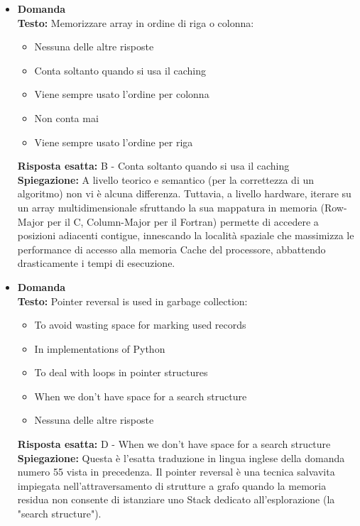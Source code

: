 \documentclass[12pt, a4paper]{article}
\newcounter{domandateoria}
\begin{document}
\begin{itemize}
    \item {}\textbf{Domanda \thedomandateoria} \\
    \textbf{Testo:} Memorizzare array in ordine di riga o colonna:
    \begin{itemize}
        \item[A)] Nessuna delle altre risposte
        \item[B)] Conta soltanto quando si usa il caching
        \item[C)] Viene sempre usato l'ordine per colonna
        \item[D)] Non conta mai
        \item[E)] Viene sempre usato l'ordine per riga
    \end{itemize}
    \textbf{Risposta esatta:} B - Conta soltanto quando si usa il caching \\
    \textbf{Spiegazione:} A livello teorico e semantico (per la correttezza di un algoritmo) non vi è alcuna differenza. Tuttavia, a livello hardware, iterare su un array multidimensionale sfruttando la sua mappatura in memoria (Row-Major per il C, Column-Major per il Fortran) permette di accedere a posizioni adiacenti contigue, innescando la località spaziale che massimizza le performance di accesso alla memoria Cache del processore, abbattendo drasticamente i tempi di esecuzione.
    \vspace{0.3cm}

    \item {}\textbf{Domanda \thedomandateoria} \\
    \textbf{Testo:} Pointer reversal is used in garbage collection:
    \begin{itemize}
        \item[A)] To avoid wasting space for marking used records
        \item[B)] In implementations of Python
        \item[C)] To deal with loops in pointer structures
        \item[D)] When we don't have space for a search structure
        \item[E)] Nessuna delle altre risposte
    \end{itemize}
    \textbf{Risposta esatta:} D - When we don't have space for a search structure \\
    \textbf{Spiegazione:} Questa è l'esatta traduzione in lingua inglese della domanda numero 55 vista in precedenza. Il pointer reversal è una tecnica salvavita impiegata nell'attraversamento di strutture a grafo quando la memoria residua non consente di istanziare uno Stack dedicato all'esplorazione (la "search structure").
    \vspace{0.3cm}


\end{itemize}
\end{document}
